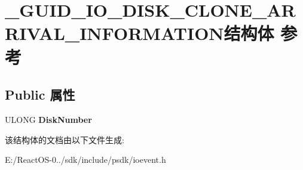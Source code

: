 \hypertarget{struct___g_u_i_d___i_o___d_i_s_k___c_l_o_n_e___a_r_r_i_v_a_l___i_n_f_o_r_m_a_t_i_o_n}{}\section{\+\_\+\+G\+U\+I\+D\+\_\+\+I\+O\+\_\+\+D\+I\+S\+K\+\_\+\+C\+L\+O\+N\+E\+\_\+\+A\+R\+R\+I\+V\+A\+L\+\_\+\+I\+N\+F\+O\+R\+M\+A\+T\+I\+O\+N结构体 参考}
\label{struct___g_u_i_d___i_o___d_i_s_k___c_l_o_n_e___a_r_r_i_v_a_l___i_n_f_o_r_m_a_t_i_o_n}
\subsection*{Public 属性}
\begin{DoxyCompactItemize}
\item 
\mbox{\label{struct___g_u_i_d___i_o___d_i_s_k___c_l_o_n_e___a_r_r_i_v_a_l___i_n_f_o_r_m_a_t_i_o_n_adc2213ac80f044c50d14f50b3fb49a63}} 
U\+L\+O\+NG {\bfseries Disk\+Number}
\end{DoxyCompactItemize}


该结构体的文档由以下文件生成\+:\begin{DoxyCompactItemize}
\item 
E\+:/\+React\+O\+S-\/0../sdk/include/psdk/ioevent.\+h\end{DoxyCompactItemize}
